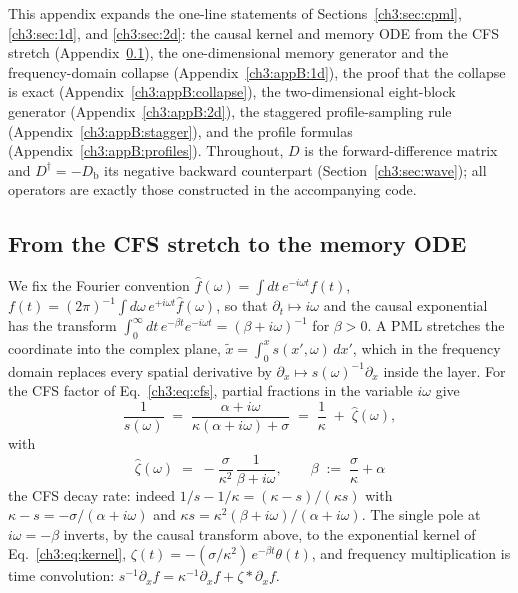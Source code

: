 \label{ch3:appB:cpml}

This appendix expands the one-line statements of
Sections~\ref{ch3:sec:cpml}, \ref{ch3:sec:1d}, and \ref{ch3:sec:2d}: the causal kernel
and memory ODE from the CFS stretch
(Appendix~\ref{ch3:appB:kernel}), the one-dimensional memory generator and
the frequency-domain collapse (Appendix~\ref{ch3:appB:1d}), the proof that
the collapse is exact (Appendix~\ref{ch3:appB:collapse}), the
two-dimensional eight-block generator
(Appendix~\ref{ch3:appB:2d}), the staggered profile-sampling rule
(Appendix~\ref{ch3:appB:stagger}), and the profile formulas
(Appendix~\ref{ch3:appB:profiles}).  Throughout, $D$ is the
forward-difference matrix and $D^{\dagger}=-D_{\mathrm{b}}$ its negative
backward counterpart (Section~\ref{ch3:sec:wave}); all operators are exactly
those constructed in the accompanying code.

\subsection{From the CFS stretch to the memory ODE}
\label{ch3:appB:kernel}

We fix the Fourier convention
$\hat f(\omega)=\int dt\,e^{-i\omega t}f(t)$,
$f(t)=(2\pi)^{-1}\int d\omega\,e^{+i\omega t}\hat f(\omega)$, so that
$\partial_t\mapsto i\omega$ and the causal exponential has the transform
$\int_0^{\infty}dt\,e^{-\beta t}e^{-i\omega t}=(\beta+i\omega)^{-1}$ for
$\beta>0$.  A PML stretches the coordinate into the complex plane,
$\tilde x=\int_0^x s(x',\omega)\,dx'$, which in the frequency domain
replaces every spatial derivative by
$\partial_x\mapsto s(\omega)^{-1}\partial_x$ inside the layer.  For the
CFS factor of Eq.~\eqref{ch3:eq:cfs}, partial fractions in the variable
$i\omega$ give
\begin{equation}
  \frac{1}{s(\omega)}
  \;=\; \frac{\alpha+i\omega}{\kappa(\alpha+i\omega)+\sigma}
  \;=\; \frac{1}{\kappa} \;+\; \hat\zeta(\omega),
  \label{ch3:appB:eq:invs}
\end{equation}
with
\begin{equation}
  \hat\zeta(\omega) \;=\; -\frac{\sigma}{\kappa^{2}}\,
  \frac{1}{\beta+i\omega},
  \qquad
  \beta \;:=\; \frac{\sigma}{\kappa}+\alpha
  \label{ch3:appB:eq:zetahat}
\end{equation}
the CFS decay rate: indeed
$1/s-1/\kappa=(\kappa-s)/(\kappa s)$ with
$\kappa-s=-\sigma/(\alpha+i\omega)$ and
$\kappa s=\kappa^{2}(\beta+i\omega)/(\alpha+i\omega)$.  The single pole
at $i\omega=-\beta$ inverts, by the causal transform above, to the
exponential kernel of Eq.~\eqref{ch3:eq:kernel},
$\zeta(t)=-(\sigma/\kappa^{2})\,e^{-\beta t}\theta(t)$, and frequency
multiplication is time convolution:
$s^{-1}\partial_x f = \kappa^{-1}\partial_x f + \zeta * \partial_x f$.

